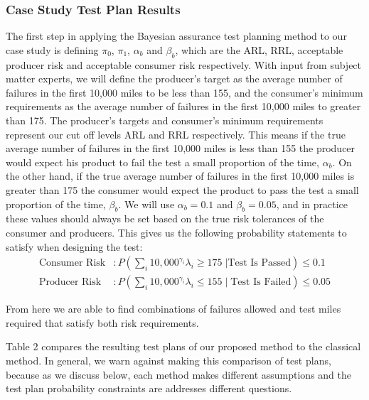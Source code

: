 \documentclass[12pt]{article}
\begin{document}
\subsubsection{Case Study Test Plan Results}
The first step in applying the Bayesian assurance test planning method to our case study is defining $\pi_0$,
$\pi_1$, $\alpha_b$ and $\beta_b$, which are the ARL, RRL, acceptable producer risk
and acceptable consumer risk respectively.  With input from subject matter
experts,  we will define the producer's target as the average number of
failures in the first 10,000 miles to be less than 155, and the consumer's minimum
requirements as the average number of failures in the first 10,000 miles to
greater than 175. The producer's targets and consumer's minimum requirements represent our cut off levels ARL and RRL respectively.  This means if the true average number of failures in the first 10,000 miles is less than 155 the producer would expect his product to fail the test a small proportion of the time, $\alpha_b$.  On the other hand, if the true average number of failures in the first 10,000 miles is greater than 175 the consumer would expect the product to pass the test a small proportion of the time, $\beta_b$. We will use $\alpha_b = 0.1$ and $\beta_b = 0.05$, and in practice these values should always be set based on
the true risk tolerances of the consumer and producers.  This gives us the
following probability statements to satisfy when designing the test:
\\
$$
\begin{aligned}
  \text{Consumer Risk} &: P(\sum_i 10,000^{\gamma_i} \lambda_i \geq 175 \; \vert \text{Test Is Passed}) \leq 0.1  \\
  \text{Producer Risk} &: P(\sum_i 10,000^{\gamma_i} \lambda_i \leq 155 \; \vert \; \text{Test Is Failed}) \leq 0.05
\end{aligned}
$$

From here we are able to find combinations of failures allowed and test miles
required that satisfy both risk requirements.

Table 2 compares the resulting test plans of our proposed method to the classical method. In general, we warn against making this comparison of test plans, because as we discuss below, each method makes different assumptions and the test plan probability constraints are addresses different questions.
\end{document}
